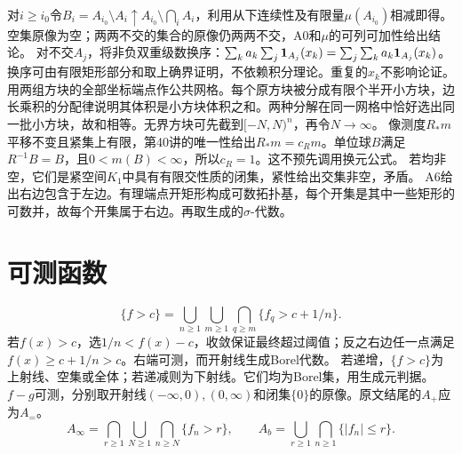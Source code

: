 \documentclass[UTF8,fontset=fandol,11pt]{ctexart}
\begin{document}
对$i\ge i_0$令$B_i=A_{i_0}\setminus A_i\uparrow A_{i_0}\setminus\bigcap_iA_i$，利用从下连续性及有限量$\mu(A_{i_0})$相减即得。
空集原像为空；两两不交的集合的原像仍两两不交，A0和$\mu$的可列可加性给出结论。
对不交$A_j$，将非负双重级数换序：$\sum_k a_k\sum_j\mathbf1_{A_j}(x_k)=\sum_j\sum_k a_k\mathbf1_{A_j}(x_k)$。换序可由有限矩形部分和取上确界证明，不依赖积分理论。重复的$x_k$不影响论证。
用两组方块的全部坐标端点作公共网格。每个原方块被分成有限个半开小方块，边长乘积的分配律说明其体积是小方块体积之和。两种分解在同一网格中恰好选出同一批小方块，故和相等。无界方块可先截到$[-N,N)^n$，再令$N\to\infty$。
像测度$R_*m$平移不变且紧集上有限，第40讲的唯一性给出$R_*m=c_Rm$。单位球$B$满足$R^{-1}B=B$，且$0<m(B)<\infty$，所以$c_R=1$。这不预先调用换元公式。
若均非空，它们是紧空间$K_1$中具有有限交性质的闭集，紧性给出交集非空，矛盾。
A6给出右边包含于左边。有理端点开矩形构成可数拓扑基，每个开集是其中一些矩形的可数并，故每个开集属于右边。再取生成的$\sigma$-代数。
\section{可测函数}
\[\{f>c\}=\bigcup_{n\ge1}\bigcup_{m\ge1}\bigcap_{q\ge m}\{f_q>c+1/n\}.\]
若$f(x)>c$，选$1/n<f(x)-c$，收敛保证最终超过阈值；反之右边任一点满足$f(x)\ge c+1/n>c$。右端可测，而开射线生成Borel代数。
若递增，$\{f>c\}$为上射线、空集或全体；若递减则为下射线。它们均为Borel集，用生成元判据。
$f-g$可测，分别取开射线$(-\infty,0),(0,\infty)$和闭集$\{0\}$的原像。原文结尾的$A_+$应为$A_=$。
\[A_\infty=\bigcap_{r\ge1}\bigcup_{N\ge1}\bigcap_{n\ge N}\{f_n>r\},\qquad A_b=\bigcup_{r\ge1}\bigcap_{n\ge1}\{|f_n|\le r\}.\]
\end{document}

